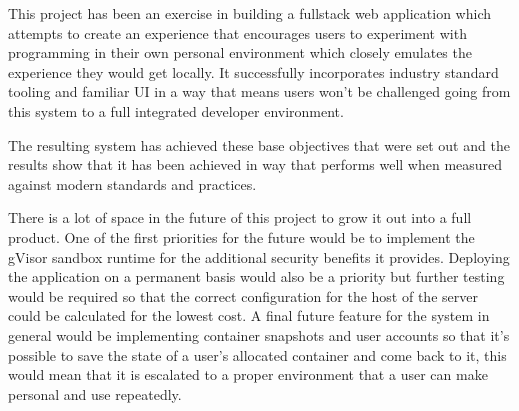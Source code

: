 \documentclass[12pt, a4paper]{extreport}
\begin{document}
This project has been an exercise in building a fullstack web application which attempts to create an experience that encourages users to experiment with programming in their own personal environment which closely emulates the experience they would get locally. It successfully incorporates industry standard tooling and familiar UI in a way that means users won't be challenged going from this system to a full integrated developer environment.

The resulting system has achieved these base objectives that were set out and the results show that it has been achieved in way that performs well when measured against modern standards and practices.

There is a lot of space in the future of this project to grow it out into a full product. One of the first priorities for the future would be to implement the gVisor sandbox runtime for the additional security benefits it provides. Deploying the application on a permanent basis would also be a priority but further testing would be required so that the correct configuration for the host of the server could be calculated for the lowest cost. A final future feature for the system in general would be implementing container snapshots and user accounts so that it's possible to save the state of a user's allocated container and come back to it, this would mean that it is escalated to a proper environment that a user can make personal and use repeatedly. 

\pagebreak


\printbibliography
\pagebreak



% 
\end{document}
